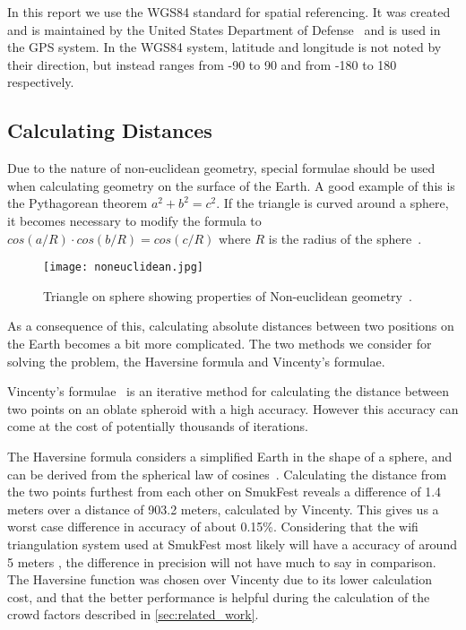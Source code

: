 In this report we use the WGS84 standard for spatial referencing. It was created and is maintained by the United States Department of Defense~\cite{WGS84} and is used in the GPS system. In the WGS84 system, latitude and longitude is not noted by their direction, but instead ranges from -90 to 90 and from -180 to 180 respectively.

\subsection{Calculating Distances}

Due to the nature of non-euclidean geometry, special formulae should be used when calculating geometry on the surface of the Earth. A good example of this is the Pythagorean theorem $a^2 + b^2 = c^2$. If the triangle is curved around a sphere, it becomes necessary to modify the formula to $cos(a/R) \cdot cos(b/R) = cos(c/R)$ where $R$ is the radius of the sphere~\cite{website:lawofcosines}.

\begin{figure}[htbp]
    \centering
\texttt{[image: noneuclidean.jpg]}
\caption[Triangle on sphere]{Triangle on sphere showing properties of Non-euclidean geometry~\cite{earthtriangle}.}
\label{noneuclidean}
\end{figure}

As a consequence of this, calculating absolute distances between two positions on the Earth becomes a bit more complicated. The two methods we consider for solving the problem, the Haversine formula and Vincenty's formulae.

Vincenty's formulae~\cite{vincenty} is an iterative method for calculating the distance between two points on an oblate spheroid with a high accuracy. However this accuracy can come at the cost of potentially thousands of iterations.

The Haversine formula considers a simplified Earth in the shape of a sphere, and can be derived from the spherical law of cosines~\cite{website:lawofcosines}. Calculating the distance from the two points furthest from each other on SmukFest reveals a difference of 1.4 meters over a distance of 903.2 meters, calculated by Vincenty. This gives us a worst case difference in accuracy of about 0.15\%. Considering that the wifi triangulation system used at SmukFest most likely will have a accuracy of around 5 meters \cite{ciscoaccu}, the difference in precision will not have much to say in comparison. The Haversine function was chosen over Vincenty due to its lower calculation cost, and that the better performance is helpful during the calculation of the crowd factors described in \cref{sec:related_work}.


